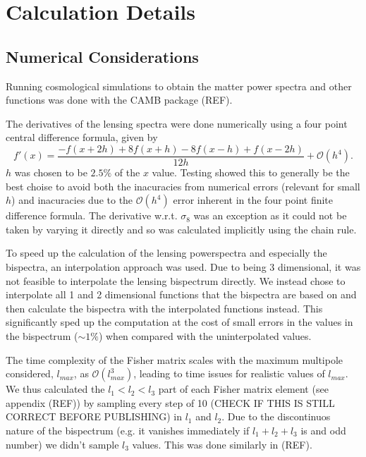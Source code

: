 \documentclass[11pt]{article} %
\begin{document}
\section{Calculation Details}\label{sec:calcdetails}
\subsection{Numerical Considerations}

Running cosmological simulations to obtain the matter power spectra and other functions was done with the CAMB package (REF). 

The derivatives of the lensing spectra were done numerically using a four point central difference formula, given by
\begin{equation*}
    f'(x) = \frac{-f(x + 2h) + 8f(x+h) - 8 f(x - h) + f(x - 2h)}{12h} + \mathcal O (h^4).
\end{equation*}
$h$ was chosen to be $2.5\%$ of the $x$ value. Testing showed this to generally be the best choise to avoid both the inacuracies from numerical errors (relevant for small $h$) and inacuracies due to the $\mathcal O(h^4)$ error inherent in the four point finite difference formula. The derivative w.r.t. $\sigma_8$ was an exception as it could not be taken by varying it directly and so was calculated implicitly using the chain rule.

To speed up the calculation of the lensing powerspectra and especially the bispectra, an interpolation approach was used. Due to being 3 dimensional, it was not feasible to interpolate the lensing bispectrum directly. We instead chose to interpolate all 1 and 2 dimensional functions that the bispectra are based on and then calculate the bispectra with the interpolated functions instead. This significantly sped up the computation at the cost of small errors in the values in the bispectrum ($\sim 1\%$) when compared with the uninterpolated values.

The time complexity of the Fisher matrix scales with the maximum multipole considered, $l_{max}$, as $\mathcal O (l_{max}^3)$, leading to time issues for realistic values of $l_{max}$. We thus calculated the $l_1 < l_2 < l_3$ part of each Fisher matrix element (see appendix (REF)) by sampling every step of 10 (CHECK IF THIS IS STILL CORRECT BEFORE PUBLISHING) in $l_1$ and $l_2$. Due to the discontinuos nature of the bispectrum (e.g. it vanishes immediately if $l_1 + l_2 + l_3$ is and odd number) we didn't sample $l_3$ values. This was done similarly in (REF).
\end{document}

